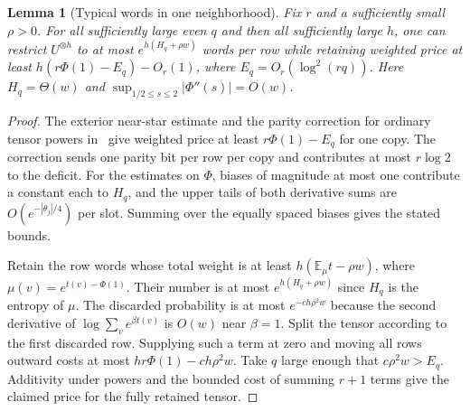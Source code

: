 \documentclass[11pt]{article}
\newtheorem{lemma}[theorem]{Lemma}
\theoremstyle{remark}
\begin{document}
\begin{lemma}[Typical words in one neighborhood]\label{typical}
Fix $r$ and a sufficiently small $\rho>0$. For all sufficiently large even $q$ and then all sufficiently large $h$, one can restrict $U^{\otimes h}$ to at most $e^{h(H_q+\rho w)}$ words per row while retaining weighted price at least $h(r\Phi(1)-E_q)-O_r(1)$, where $E_q=O_r(\log^2(rq))$. Here $H_q=\Theta(w)$ and $\sup_{1/2\le s\le2}|\Phi''(s)|=O(w)$.
\end{lemma}
\begin{proof}
The exterior near-star estimate and the parity correction for ordinary tensor powers in~\cite{circuits} give weighted price at least $r\Phi(1)-E_q$ for one copy. The correction sends one parity bit per row per copy and contributes at most $r\log 2$ to the deficit. For the estimates on $\Phi$, biases of magnitude at most one contribute a constant each to $H_q$, and the upper tails of both derivative sums are $O(e^{-|\theta_j|/4})$ per slot. Summing over the equally spaced biases gives the stated bounds.

Retain the row words whose total weight is at least $h(\mathbb E_\mu t-\rho w)$, where $\mu(v)=e^{t(v)-\Phi(1)}$. Their number is at most $e^{h(H_q+\rho w)}$ since $H_q$ is the entropy of $\mu$. The discarded probability is at most $e^{-c h\rho^2 w}$ because the second derivative of $\log\sum_v e^{\beta t(v)}$ is $O(w)$ near $\beta=1$. Split the tensor according to the first discarded row. Supplying such a term at zero and moving all rows outward costs at most $hr\Phi(1)-ch\rho^2 w$. Take $q$ large enough that $c\rho^2 w>E_q$. Additivity under powers and the bounded cost of summing $r+1$ terms give the claimed price for the fully retained tensor.
\end{proof}
\end{document}
